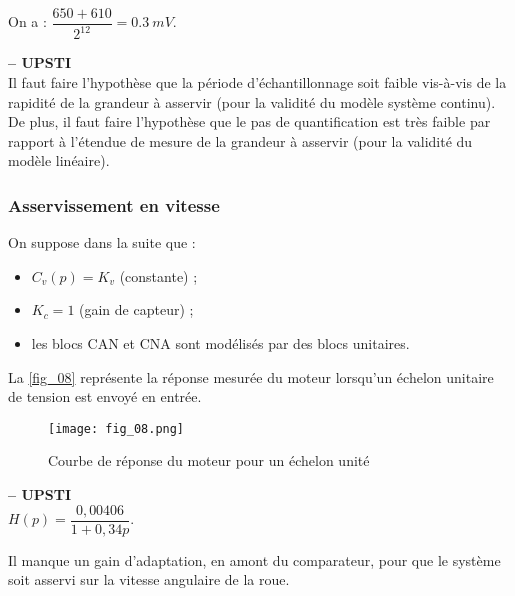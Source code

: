 \ifprof
\begin{corrige}
On  a : $\dfrac{650+610}{2^{12}} = \SI{0,3}{mV}$.
\end{corrige}
\else
\fi

\ifprof
\begin{corrige} \textbf{ -- UPSTI}\\
 Il faut faire l’hypothèse que la période d’échantillonnage soit faible vis-à-vis de la rapidité 
de la grandeur à asservir (pour la validité du modèle système continu). De plus, il faut faire 
l’hypothèse que le pas de quantification est très faible par rapport à l’étendue de mesure de la 
grandeur à asservir (pour la validité du modèle linéaire).
\end{corrige}
\else
\fi

\subsubsection{Asservissement en vitesse}
\ifprof\else
On suppose dans la suite que :
\begin{itemize}
\item $C_v ( p)=K_v$ (constante) ;
\item $K_c =1$ (gain de capteur) ;
\item  les blocs CAN et CNA sont modélisés par des blocs unitaires.
\end{itemize}

La \autoref{fig_08} représente la réponse mesurée du moteur lorsqu’un échelon unitaire de tension est
envoyé en entrée.

\begin{figure}[H]
\centering
\texttt{[image: fig\_08.png]}
\caption{Courbe de réponse du moteur pour un échelon unité\label{fig_08}}
\end{figure}
\fi

\ifprof
\begin{corrige}\textbf{ -- UPSTI}\\ 
$H(p)=\dfrac{0,00406}{1+0,34p}$.
\end{corrige}
\else
\fi

Il manque un gain d'adaptation, en amont du comparateur, pour que le système soit asservi sur la vitesse angulaire de la roue.

